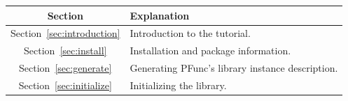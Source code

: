 \begin{center}
\begin{tabular}{|c|l|}
\hline
Section & Explanation \\
\hline
Section~\ref{sec:introduction} & Introduction to the tutorial.\\
\hline
Section~\ref{sec:install} & Installation and package information.\\
\hline
Section~\ref{sec:generate} & Generating PFunc's library instance description.\\
\hline
Section~\ref{sec:initialize} & Initializing the library.\\
\hline
\end{tabular}
\end{center}
